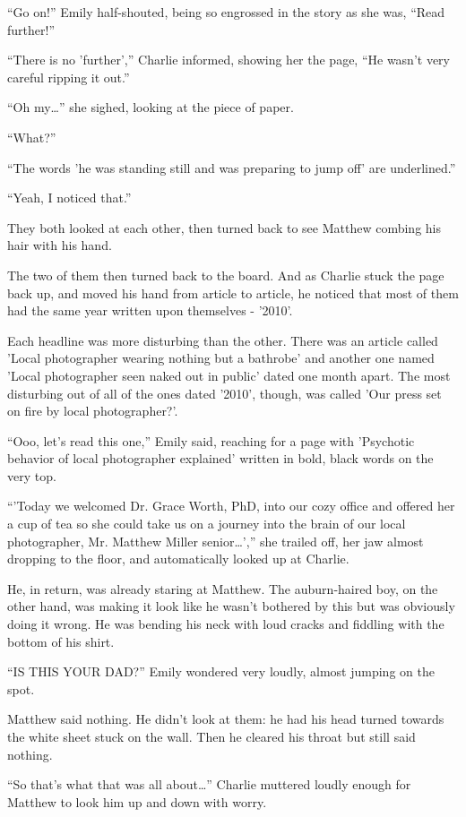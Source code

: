 “Go on!” Emily half-shouted, being so engrossed in the story as she was, “Read further!”

“There is no 'further',” Charlie informed, showing her the page, “He wasn't very careful ripping it out.”

“Oh my…” she sighed, looking at the piece of paper.

“What?”

“The words 'he was standing still and was preparing to jump off' are underlined.”

“Yeah, I noticed that.”

They both looked at each other, then turned back to see Matthew combing his hair with his hand.

The two of them then turned back to the board. And as Charlie stuck the page back up, and moved his hand from article to article, he noticed that most of them had the same year written upon themselves - '2010'.

Each headline was more disturbing than the other. There was an article called 'Local photographer wearing nothing but a bathrobe' and another one named 'Local photographer seen naked out in public' dated one month apart. The most disturbing out of all of the ones dated '2010', though, was called 'Our press set on fire by local photographer?'.

“Ooo, let's read this one,” Emily said, reaching for a page with 'Psychotic behavior of local photographer explained' written in bold, black words on the very top.

“'Today we welcomed Dr. Grace Worth, PhD, into our cozy office and offered her a cup of tea so she could take us on a journey into the brain of our local photographer, Mr. Matthew Miller senior…',” she trailed off, her jaw almost dropping to the floor, and automatically looked up at Charlie.

He, in return, was already staring at Matthew. The auburn-haired boy, on the other hand, was making it look like he wasn't bothered by this but was obviously doing it wrong. He was bending his neck with loud cracks and fiddling with the bottom of his shirt.

“IS THIS YOUR DAD?” Emily wondered very loudly, almost jumping on the spot.

Matthew said nothing. He didn't look at them: he had his head turned towards the white sheet stuck on the wall. Then he cleared his throat but still said nothing.

“So that's what that was all about…” Charlie muttered loudly enough for Matthew to look him up and down with worry.

